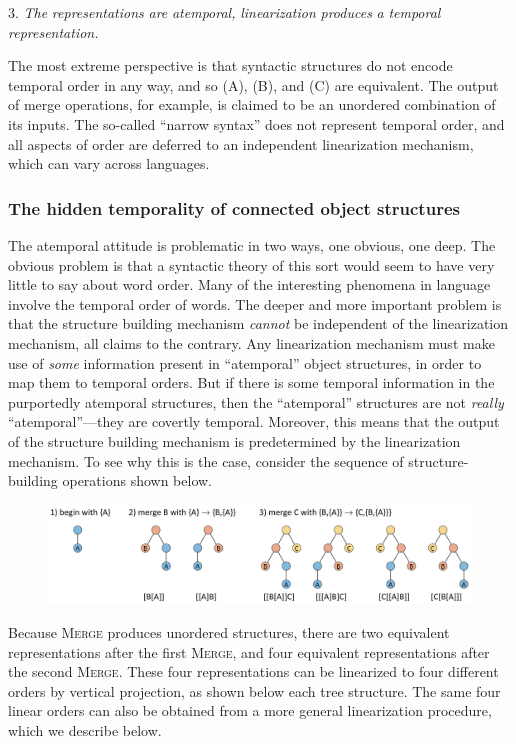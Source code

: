 3. \textit{The} \textit{representations} \textit{are} \textit{atemporal,} \textit{linearization} \textit{produces} \textit{a} \textit{temporal} \textit{representation.}

  The most extreme perspective is that syntactic structures do not encode temporal order in any way, and so (A), (B), and (C) are equivalent. The output of merge operations, for example, is claimed to be an unordered combination of its inputs. The so-called “narrow syntax” does not represent temporal order, and all aspects of order are deferred to an independent linearization mechanism, which can vary across languages. 

\subsubsection{The hidden temporality of connected object structures}

The atemporal attitude is problematic in two ways, one obvious, one deep. The obvious problem is that a syntactic theory of this sort would seem to have very little to say about word order. Many of the interesting phenomena in language involve the temporal order of words. The deeper and more important problem is that the structure building mechanism \textit{cannot} be independent of the linearization mechanism, all claims to the contrary. Any linearization mechanism must make use of \textit{some} information present in “atemporal” object structures, in order to map them to temporal orders. But if there is some temporal information in the purportedly atemporal structures, then the “atemporal” structures are not \textit{really} “atemporal”—they are covertly temporal. Moreover, this means that the output of the structure building mechanism is predetermined by the linearization mechanism. To see why this is the  case, consider the sequence of structure-building operations shown below.

  
\begin{figure}
\includegraphics[width=\textwidth]{figures/Tilsen-img42.png}
\caption{\missingcaption}
\label{fig:}
\end{figure}
 

  Because \textsc{Merge} produces unordered structures, there are two equivalent representations after the first \textsc{Merge}, and four equivalent representations after the second \textsc{Merge}. These four representations can be linearized to four different orders by vertical projection, as shown below each tree structure. The same four linear orders can also be obtained from a more general linearization procedure, which we describe below.

